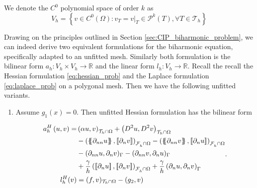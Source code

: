 We denote the $C^{0}$ polynomial space of order $k$ as
\[
V_{h} = \left\{ v \in C^{0}\left( \Omega  \right): v_{T} = v | _{T} \in \mathcal{P} ^{k}\left( T \right), \forall T \in
\mathcal{T}_{h}    \right\}
\]

Drawing on the principles outlined in Section \ref{sec:CIP_biharmonic_problem}, we can indeed derive two equivalent formulations for the biharmonic equation, specifically adapted to an unfitted mesh. Similarly both formulation is the bilinear form
$a_{h}:V_{h}
\times V_{h} \to  \mathbb{R}  $ and the linear form $l_{h}: V_{h} \to \mathbb{R} $. Recall the recall the Hessian formulation \eqref{eq:hessian_prob} and the Laplace formulation \eqref{eq:laplace_prob} on a polygonal mesh. Then we have the following
unfitted variants.

\begin{enumerate}[label=\arabic*)]
    \item Assume $g_{1}( x) = 0 $. Then unfitted Hessian formulation has the bilinear form

\begin{equation}
        \label{eq:cip_unfitted_hessian_form}
\begin{split}
a_{h}^{H} \left( u, v \right)   =&   \left( \alpha  u, v \right) _{\mathcal{T} _{h} \cap \Omega }   +  \left( D^2 u, D^2v \right) _{\mathcal{T} _{h} \cap \Omega} \\
 & -
  \left( \mean{  \partial _{n n} u }, \jump{ \partial _{n }v} \right)_{\mathcal{F}_{h}^{} \cap \Omega}  -
 \left( \mean{ \partial _{n n} v }, \jump{ \partial _{n}u }      \right)_{\mathcal{F}_{h}^{} \cap \Omega} \\
 & - ( \partial _{nn} u, \partial _{n} v)_{\Gamma } - ( \partial _{nn} v, \partial _{n} u)_{\Gamma }
 \\
 & + \frac{\gamma }{h}  \left( \jump{ \partial _{n} u}, \jump{ \partial _{n} v_{}   }   \right)_{\mathcal{F}_{h}^{} \cap \Omega} +  \frac{\gamma }{h}  \left(  \partial _{n} u,  \partial _{n} v_{}      \right)_{\Gamma } \\
l_{h}^{H}( v) & =  ( f,v)_{\mathcal{T} _{h} \cap \Omega } - (g_{2},v)
\end{split}
.
\end{equation}


\end{enumerate}
